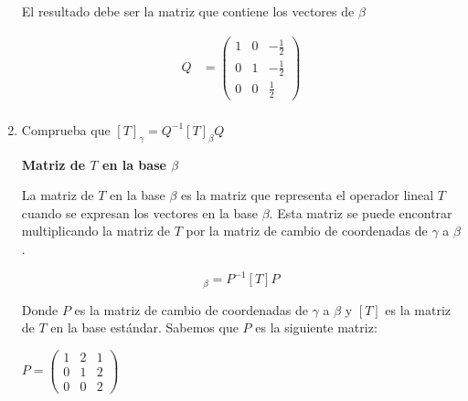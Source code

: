 \begin{enumerate}
\begin{center}
        \vspace{5mm}    

        El resultado debe ser la matriz que contiene los vectores de $\beta$
        
        \vspace{5mm}    
        \begin{align*}
            Q & = 
            \begin{pmatrix}
                1 & 0 & -\frac{1}{2} \\
                0 & 1 & -\frac{1}{2} \\
                0 & 0 & \frac{1}{2}
            \end{pmatrix} \\
        \end{align*}
    
    \end{center}
    

    \item Comprueba que $\left[ T \right]_{\gamma} = Q^{-1} \left[ T \right]_{\beta} Q$ 

    \noindent \solucion

    \textbf{Matriz de $T$ en la base $\beta$}
    
    \vspace{2mm}    

    La matriz de $T$ en la base $\beta$ es la matriz que representa el operador lineal $T$ cuando se expresan los
    vectores en la base $\beta$. Esta matriz se puede encontrar multiplicando la matriz de $T$ por la matriz de
    cambio de coordenadas de $\gamma$ a $\beta$.

    \begin{equation*}
        [T]_{\beta} = P^{-1} [T] P
    \end{equation*}

    Donde $P$ es la matriz de cambio de coordenadas de $\gamma$ a $\beta$ y $[T]$ es la matriz de $T$ en la base
    estándar. Sabemos que $P$ es la siguiente matriz:

    \begin{center}
        $
        P = 
            \begin{pmatrix}
                1 & 2 & 1 \\
                0 & 1 & 2 \\
                0 & 0 & 2
            \end{pmatrix}
        $
    \end{center}


\end{enumerate}
